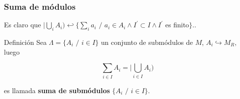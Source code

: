 \documentclass[notes=show]{beamer}%
\newenvironment{Defi}{\begin{block}{Definición}}{\end{block}}
\begin{document}
\bigskip%

\begin{frame}%


\bigskip%
\frametitle{Suma de módulos}%


\bigskip Es claro que $|%
{\displaystyle\bigcup\limits_{i}}
A_{i})\hookleftarrow\{%
{\displaystyle\sum\limits_{i}}
a_{i}$ $/$ $a_{i}\in A_{i}\wedge I^{\prime}\subset I\wedge I^{\prime}$ es
finito$\}..$

\begin{Defi}
Sea $\Lambda=\{A_{i}$ $/$ $i\in I\}$ un conjunto de submódulos de $M$,
$A_{i}\hookrightarrow M_{R},$ luego%

\[%
{\displaystyle\sum\limits_{i\in I}}
A_{i}=|%
{\displaystyle\bigcup\limits_{i\in I}}
A_{i})
\]


es llamada \textbf{suma de submódulos }$\{A_{i}$ $/$ $i\in I\}$.
\end{Defi}

%

\transboxout
\end{frame}%


\bigskip%
\end{document}
